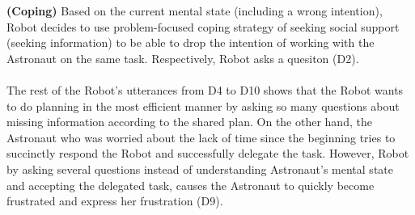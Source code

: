 \noindent\textbf{(Coping)} Based on the current mental state (including a
wrong intention), Robot decides to use problem-focused coping strategy of
seeking social support (seeking information) to be able to drop the intention of
working with the Astronaut on the same task. Respectively, Robot asks a quesiton
(D2).\\

\noindent{}\\

The rest of the Robot's utterances from D4 to D10 shows that the Robot wants to
do planning in the most efficient manner by asking so many questions about
missing information according to the shared plan. On the other hand, the
Astronaut who was worried about the lack of time since the beginning tries to
succinctly respond the Robot and successfully delegate the task. However, Robot
by asking several questions instead of understanding Astronaut's mental state
and accepting the delegated task, causes the Astronaut to quickly become
frustrated and express her frustration (D9).\\

\noindent{}\\

